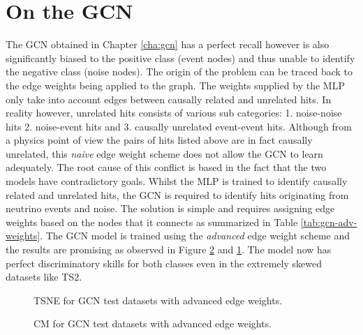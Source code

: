 \section{On the GCN}
\label{sec:rec-gcn}

The GCN obtained in Chapter \ref{cha:gcn} has a perfect recall however
is also significantly biased to the positive class (event nodes) and
thus unable to identify the negative class (noise nodes). The origin
of the problem can be traced back to the edge weights being applied to
the graph. The weights supplied by the MLP only take into account
edges between causally related and unrelated hits. In reality however,
unrelated hits consists of various sub categories: 1. noise-noise hits
2. noise-event hits and 3. causally unrelated event-event hits.
Although from a physics point of view the pairs of hits listed above
are in fact causally unrelated, this \emph{naive} edge weight scheme
does not allow the GCN to learn adequately. The root cause of this
conflict is based in the fact that the two models have contradictory
goals. Whilst the MLP is trained to identify causally related and
unrelated hits, the GCN is required to identify hits originating from
neutrino events and noise. The solution is simple and requires
assigning edge weights based on the nodes that it connects as
summarized in Table \ref{tab:gcn-adv-weights}. The GCN model is
trained using the \emph{advanced} edge weight scheme and the results
are promising as observed in Figure \ref{fig:gcn-cm-adv} and
\ref{fig:gcn-test-tsne-adv}. The model now has perfect discriminatory
skills for both classes even in the extremely skewed datasets like
TS2.

\begin{figure}[htb]
  \centering
  \caption{TSNE for GCN test datasets with advanced edge weights.}
  \label{fig:gcn-test-tsne-adv}
\end{figure}

\begin{figure}[htb]
  \centering
  \caption{CM for GCN test datasets with advanced edge weights.}
  \label{fig:gcn-cm-adv}
\end{figure}

